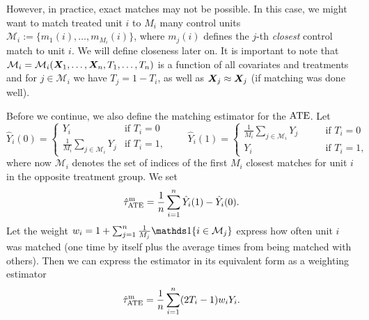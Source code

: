 \documentclass[11pt]{exam}
\begin{document}
However, in practice, exact matches may not be possible. In this case, we might want to match treated unit $i$ to $M_i$ many control units $\mathcal{M}_i := \{m_1(i), \ldots, m_{M_i}(i)\}$, where $m_j(i)$ defines the $j$-th \emph{closest} control match to unit $i$. We will define closeness later on. It is important to note that $\mathcal{M}_i = \mathcal{M}_i(\bm{X}_1, \ldots, \bm{X}_n, T_1, \ldots, T_n)$ is a function of all covariates and treatments and for $j \in \mathcal{M}_i$ we have $T_j = 1 - T_i$, as well as $\bm{X}_j \approx \bm{X}_j$ (if matching was done well).

Before we continue, we also define the matching estimator for the $\mathrm{ATE}$. Let
\[
    \hat Y_i(0) = \begin{cases}
        Y_i \qquad &\text{if } T_i = 0
        \\
        \frac{1}{M_i} \sum_{j \in \mathcal{M}_i} Y_j &\text{if } T_i = 1,
    \end{cases} 
    \qquad 
    \hat Y_i(1) = \begin{cases}
        \frac{1}{M_i} \sum_{j \in \mathcal{M}_i} Y_j \qquad &\text{if } T_i = 0
        \\
        Y_i &\text{if } T_i = 1,
    \end{cases}
\]
where now $\mathcal{M}_i$ denotes the set of indices of the first $M_i$ closest matches for unit $i$ in the opposite treatment group. We set 
\[
     \hat \tau^\mathrm{m}_{\mathrm{ATE}} = \frac{1}{n} \sum_{i=1}^n \hat Y_i(1) - \hat Y_i(0).
\]
Let the weight $w_i = 1 + \sum_{j=1}^n \frac{1}{M_j}\indicator{i \in \mathcal{M}_j}$ express how often unit $i$ was matched (one time by itself plus the average times from being matched with others). Then we can express the estimator in its equivalent form as a weighting estimator
\[
    \hat \tau^\mathrm{m}_{\mathrm{ATE}} = \frac{1}{n} \sum_{i=1}^n (2T_i - 1) w_i Y_i.
\]
\end{document}

